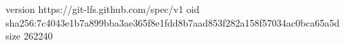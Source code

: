 version https://git-lfs.github.com/spec/v1
oid sha256:7c4043e1b7a899bba3ae365f8e1fdd8b7aad853f282a158f57034ac0bca65a5d
size 262240
